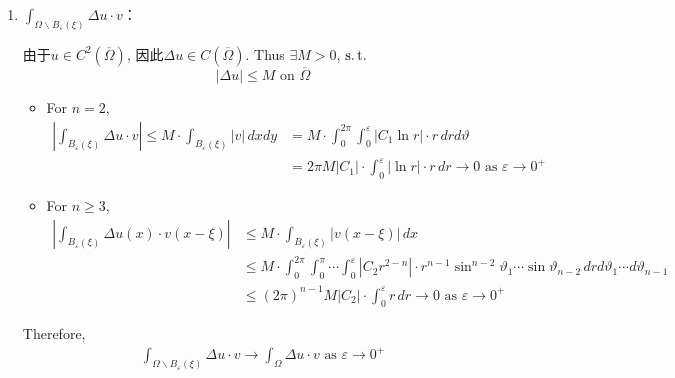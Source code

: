 	\begin{enumerate}
		\item \underline{$\int_{\Omega \backslash B_{\varepsilon}(\xi)} \Delta u \cdot v$}：
		
		\vspace*{1em}
		
		\hspace*{-1.95em}由于$u \in C^2(\overline{\Omega})$, 因此$\Delta u \in C\left( \overline{\Omega} \right)$. Thus $\exists M > 0$, $\operatorname{s.t.}$
		\[ \left| \Delta u \right| \leq M \,\, \text{on} \,\, \overline{\Omega} \]
		\begin{itemize}
			\item For $n = 2$, 
			\begin{align*}
				\left| \int_{B_{\varepsilon}(\xi)} \Delta u \cdot v \right| 
				\leq M \cdot \int_{B_{\varepsilon}(\xi)} \left| v \right| \, dxdy 
				&= M \cdot \int_{0}^{2 \pi} \int_{0}^{\varepsilon} | C_1 \ln r | \cdot r \, dr d\vartheta \\
				&= 2 \pi M | C_1 | \cdot \int_{0}^{\varepsilon} | \ln r | \cdot r \, dr \to 0 
				\,\, \text{as} \,\, \varepsilon \to 0^+
			\end{align*}
			
			\vspace*{1em}
			
			\item For $n \geq 3$, 
			\begin{align*}
				\left| \int_{B_{\varepsilon}(\xi)} \Delta u(x) \cdot v(x - \xi) \right| 
				&\leq M \cdot \int_{B_{\varepsilon}(\xi)} \left| v(x - \xi) \right| \, dx \\
				&\leq M \cdot \int_{0}^{2\pi} \int_{0}^{\pi} \cdots \int_{0}^{\varepsilon} | C_2 r^{2 - n} | \cdot r^{n - 1} \sin^{n - 2} \vartheta_1 \cdots \sin \vartheta_{n - 2} \, dr d\vartheta_1 \cdots d\vartheta_{n - 1} \\
				&\leq (2\pi)^{n - 1} M |C_2 | \cdot \int_{0}^{\varepsilon} r \, dr \to 0 
				\,\, \text{as} \,\, \varepsilon \to 0^+
			\end{align*}
		\end{itemize}
		Therefore, 
		\begin{align*}
			\int_{\Omega \backslash B_{\varepsilon}(\xi)} \Delta u \cdot v \to \int_{\Omega} \Delta u \cdot v 
			\,\, \text{as} \,\, \varepsilon \to 0^+
		\end{align*}
		
		\vspace*{4em}
		

\end{enumerate}
